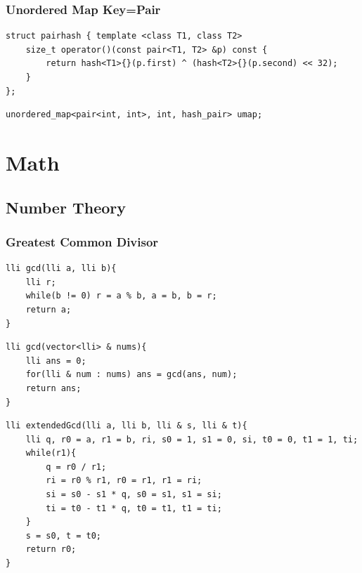 \documentclass[twoside]{article}
\begin{document}
\begin{multicols*}{2}
\subsubsection*{Unordered Map Key=Pair}
\begin{verbatim}
struct pairhash { template <class T1, class T2>
	size_t operator()(const pair<T1, T2> &p) const {
		return hash<T1>{}(p.first) ^ (hash<T2>{}(p.second) << 32);
	}
};
\end{verbatim}
\vspace{-12pt}
\begin{verbatim}
unordered_map<pair<int, int>, int, hash_pair> umap;

\end{verbatim}

\sectionfont{\bfseries\sffamily\centering\Huge}
\vspace{1em}
\section*{Math}
\vspace{3em}
\subsectionfont{\bfseries\sffamily\centering\LARGE}
\vspace{0em}
\subsection*{Number Theory}
\vspace{2em}
\subsubsectionfont{\large\bfseries\sffamily\underline}
\subsubsection*{Greatest Common Divisor}
\begin{verbatim}
lli gcd(lli a, lli b){
	lli r;
	while(b != 0) r = a % b, a = b, b = r;
	return a;
}

\end{verbatim}
\vspace{-12pt}
\begin{verbatim}
lli gcd(vector<lli> & nums){
	lli ans = 0;
	for(lli & num : nums) ans = gcd(ans, num);
	return ans;
}

\end{verbatim}
\vspace{-12pt}
\begin{verbatim}
lli extendedGcd(lli a, lli b, lli & s, lli & t){
	lli q, r0 = a, r1 = b, ri, s0 = 1, s1 = 0, si, t0 = 0, t1 = 1, ti;
	while(r1){
		q = r0 / r1;
		ri = r0 % r1, r0 = r1, r1 = ri;
		si = s0 - s1 * q, s0 = s1, s1 = si;
		ti = t0 - t1 * q, t0 = t1, t1 = ti;
	}
	s = s0, t = t0;
	return r0;
}


\end{verbatim}
\end{multicols*}
\end{document}

